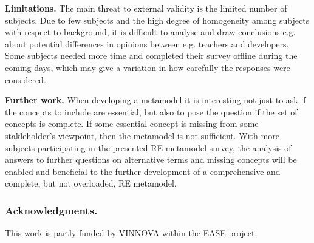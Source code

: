 \documentclass[runningheads,a4paper]{llncs}
\begin{document}
{\bf Limitations. } The main threat to external validity is the limited number of subjects. Due to few subjects and the high degree of homogeneity among subjects with respect to background, it is difficult to analyse and draw conclusions e.g. about potential differences in opinions between e.g. teachers and developers. Some subjects needed more time and completed their survey offline during the coming days, which may give a variation in how carefully the responses were considered. 
 
{\bf Further work.} When developing a metamodel it is interesting not just to ask if the concepts to include are essential, but also to pose the question if the set of concepts is complete. If some essential concept is missing from some stakleholder's viewpoint, then the metamodel is not sufficient.  With more subjects participating in the presented RE metamodel survey, the analysis of answers to further questions on alternative terms and missing concepts will be enabled and beneficial to the further development of a comprehensive and complete, but not overloaded, RE metamodel. %


\vspace{-0.2cm}

\subsubsection*{Acknowledgments.} This work is partly funded by  VINNOVA within the EASE project.
\end{document}
